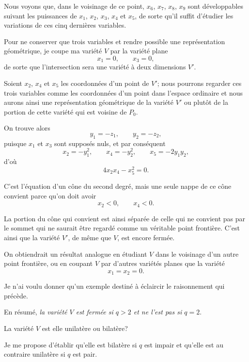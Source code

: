 \documentclass{article}
\begin{document}
Nous voyons que, dans le voisinage de ce point, $x_{6}$, $x_{7}$, $x_{8}$, $x_{9}$ sont développables suivant les puissances de $x_{1}$, $x_{2}$, $x_{3}$, $x_{4}$ et $x_{5}$, de sorte qu'il suffit d'étudier les variations de ces cinq dernières variables.

Pour ne conserver que trois variables et rendre possible une représentation géométrique, je coupe ma variété $V$ par la variété plane
\[ x_{1} = 0, \qquad x_{3} = 0, \]
de sorte que l'intersection sera une variété à deux dimensions $V'$.

Soient $x_{2}$, $x_{4}$ et $x_{5}$ les coordonnées d'un point de $V'$; nous pourrons regarder ces trois variables comme les coordonnées d'un point dans l'espace ordinaire et nous aurons ainsi une représentation géométrique de la variété $V'$ ou plutôt de la portion de cette variété qui est voisine de $P_{0}$.

On trouve alors
\[ y_{1} = -z_{1}, \qquad y_{2} = -z_{2}, \]
puisque $x_{1}$ et $x_{3}$ sont supposés nuls, et par conséquent
\[ x_{2} = -y^{2}_{1}, \qquad x_{4} = -y^{2}_{2}, \qquad x_{5} = -2y_{1}y_{2}, \]
d'où
\[ 4x_{2}x_{4} - x^{2}_{5} = 0. \]

C'est l'équation d'un cône du second degré, mais une seule nappe de ce cône convient parce qu'on doit avoir
\[ x_{2} < 0, \qquad x_{4} < 0. \]

La portion du cône qui convient est ainsi séparée de celle qui ne convient pas par le sommet qui ne saurait être regardé comme un véritable point frontière. C'est ainsi que la variété $V'$, de même que $V$, est encore fermée.

On obtiendrait un résultat analogue en étudiant $V$ dans le voisinage d'un autre point frontière, ou en coupant $V$ par d'autres variétés planes que la variété
\[ x_{1} = x_{2} = 0. \]

Je n'ai voulu donner qu'un exemple destiné à éclaircir le raisonnement qui précède.

En résumé, \emph{la variété $V$ est fermée si $q > 2$ et ne l'est pas si $q = 2$}.

La variété $V$ est elle unilatère ou bilatère?

Je me propose d'établir qu'elle est bilatère si $q$ est impair et qu'elle est au contraire unilatère si $q$ est pair.
\end{document}
